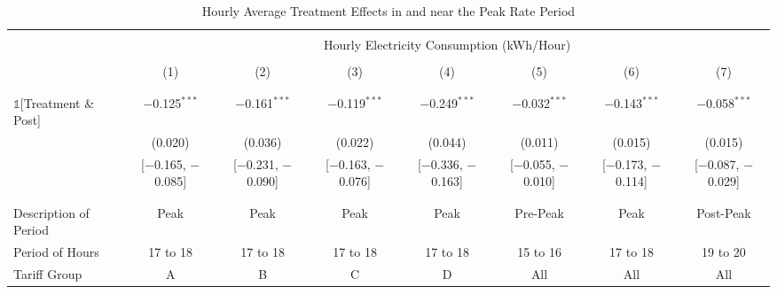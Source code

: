    \begin{table}[h!]
        \centering
        \caption{Hourly Average Treatment Effects in and near the Peak Rate Period}
        \label{Table:Hourly-Average-Treatment-Effects-in-and-near-the-Peak-Rate-Period}
        \vspace{0.1cm}
        \small
        \begin{adjustbox}{scale = 0.75}
            \begin{threeparttable}
                \begin{tabular}{@{\extracolsep{3pt}}lccccccc}
                    \\[-5.5ex]
                    \hline \hline
                    \\[-3.0ex]
                    & \multicolumn{7}{c}{Hourly Electricity Consumption  (kWh/Hour)} \\
                    \\[-3.0ex]
                    & (1) & (2) & (3) & (4) & (5) & (6) & (7) \\
                    \\[-3.0ex]
                    \hline
                    \\[-2.0ex]
                    $\mathbb{1}$[Treatment \& Post] & $-$0.125$^{***}$ & $-$0.161$^{***}$ & $-$0.119$^{***}$ & $-$0.249$^{***}$ & $-$0.032$^{***}$ & $-$0.143$^{***}$ & $-$0.058$^{***}$ \\
                    & (0.020) & (0.036) & (0.022) & (0.044) & (0.011) & (0.015) & (0.015) \\
                    & [$-$0.165, $-$0.085] & [$-$0.231, $-$0.090] & [$-$0.163, $-$0.076] & [$-$0.336, $-$0.163] & [$-$0.055, $-$0.010] & [$-$0.173, $-$0.114] & [$-$0.087, $-$0.029] \\
                    & & & & & & & \\
                    \hline
                    \\[-2.0ex]
                    Description of Period & Peak & Peak & Peak & Peak & Pre-Peak & Peak & Post-Peak \\
                    Period of Hours & 17 to 18 & 17 to 18 & 17 to 18 & 17 to 18 & 15 to 16 & 17 to 18 & 19 to 20 \\
                    Tariff Group & A & B & C & D & All & All & All \\

\end{tabular}
\end{threeparttable}
\end{adjustbox}
\end{table}
